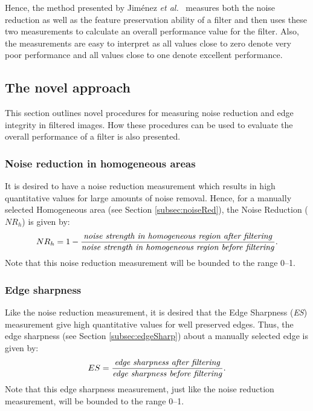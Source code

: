 \documentclass[12pt]{report}
\begin{document}
Hence, the method presented by Jim\'enez \emph{et al.}~\cite{jim2001} measures both the noise reduction
as well as the feature preservation ability of a filter and then uses these two
measurements to calculate an overall performance value for the filter.
Also, the measurements are easy to interpret as all values close to 
zero denote very poor performance and all values close to one denote excellent 
performance.

\subsection{The novel approach}
\label{subsec:novApproach}
This section outlines novel procedures for measuring 
noise reduction and edge integrity in filtered images.
How these procedures
can be used to evaluate the overall performance of a filter
is also presented.

\subsubsection{Noise reduction in homogeneous areas}
It is desired to have a noise reduction measurement which results
in high quantitative values for large amounts of noise removal.
Hence, for a manually selected Homogeneous area (see Section \ref{subsec:noiseRed}), 
the Noise Reduction ($NR_{h}$) is given by:
\begin{equation}
		\label{eq:sr}
NR_{h}=1-\frac{\mbox{\emph{noise strength in homogeneous region after filtering}}}
              {\mbox{\emph{noise strength in homogeneous region before filtering}}}.
\end{equation}
Note that this noise reduction measurement will be bounded to the range 0--1.

\subsubsection{Edge sharpness}
Like the noise reduction measurement, it is desired that
the Edge Sharpness (\emph{ES}) measurement give high quantitative values for
well preserved edges.
Thus, the edge sharpness (see Section \ref{subsec:edgeSharp}) 
about a manually selected edge is given by:
\begin{equation}
		\label{eq:es}
                ES = \frac      {\mbox{\emph{edge sharpness after filtering}}}
                                {\mbox{\emph{edge sharpness before filtering}}}.
\end{equation}
Note that this edge sharpness measurement, just like the noise reduction measurement, 
will be bounded to the range 0--1.
\end{document}
